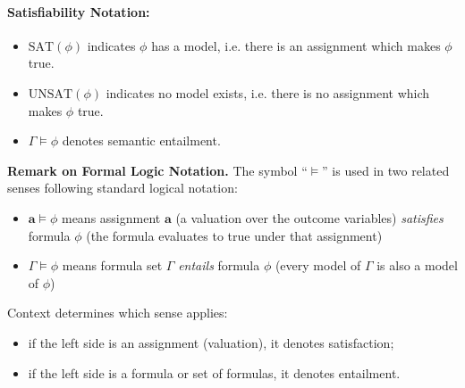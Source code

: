 \paragraph{Satisfiability Notation:}

\begin{itemize}
    \item $\mathrm{SAT}(\phi)$ indicates $\phi$ has a model, \newline\indent i.e. there is an assignment which makes $\phi$ true.
    \item $\mathrm{UNSAT}(\phi)$ indicates no model exists, \newline\indent i.e. there is no assignment which makes $\phi$ true.
    \item $\Gamma \models \phi$ denotes semantic entailment.
\end{itemize}

\begin{mdframed}
\noindent\textbf{Remark on Formal Logic Notation.} The symbol ``$\models$'' is used in two related senses following standard logical notation:
\begin{itemize}
    \item $\mathbf{a} \models \phi$ means assignment $\mathbf{a}$ (a valuation over the outcome variables) \emph{satisfies} formula $\phi$ (the formula evaluates to true under that assignment)
    \item $\Gamma \models \phi$ means formula set $\Gamma$ \emph{entails} formula $\phi$ (every model of $\Gamma$ is also a model of $\phi$)
\end{itemize}
Context determines which sense applies:
\begin{itemize}
    \item if the left side is an assignment (valuation), it denotes satisfaction;
    \item if the left side is a formula or set of formulas, it denotes entailment.
\end{itemize}
\end{mdframed}

